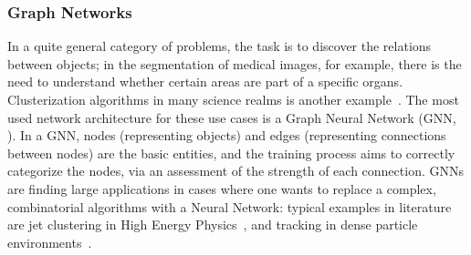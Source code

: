 \subsubsection{Graph Networks}
In a quite general category of problems, the task is to discover the relations between objects; in the  segmentation of medical images, for example, there is the need to understand whether certain areas are part of a specific organs. Clusterization algorithms in many science realms is another example~\cite{clusterization}.
The most used  network architecture for these use cases is a Graph Neural Network (GNN, \cite{gnn}).
In a GNN, nodes (representing objects) and edges (representing connections between nodes) are the basic entities, and the training process aims to correctly categorize the nodes, via an assessment of the strength of each connection.
GNNs are finding large applications in cases where one wants to replace a complex, combinatorial algorithms with a Neural Network: typical examples in literature are jet clustering in High Energy Physics~\cite{graphclustering}, and tracking in dense particle environments~\cite{graphtracking}.


% 

